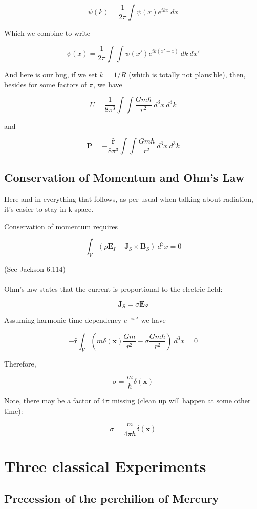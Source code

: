 \documentclass {article}
\renewcommand\vec{\mathbf}
\let\OldHat\hat
\renewcommand{\hat}[1]{\OldHat{\mathbf{#1}}}
\begin{document}
$$\psi ( k ) = \frac 1 {2 \pi} \int \psi(x) e ^{ikx} ~ dx $$

Which we combine to write

$$\psi(x) = \frac 1 {2 \pi} \int \int \psi (x') e^{ik(x' - x)} ~dk ~dx'$$


And here is our bug, if we set $k$ = $1/R$ (which is totally not plausible), then, besides for some factors of  $\pi$, we have

$$U =\frac 1 {8 \pi^3} \int \int \frac {Gm\hbar}{r^2} ~d^3x ~ d^3k$$

and 

$$\vec P = -\frac {\hat r} {8 \pi^3} \int \int \frac {Gm\hbar}{r^2} ~d^3x ~ d^3k$$
 

\newpage


\subsection {Conservation of Momentum and Ohm's Law}

Here and in everything that follows, as per usual when talking about radiation, it's easier to stay in k-space.

Conservation of momentum requires

$$\int_V \left(  \rho \vec E_I  + \vec J_S \times \vec B_S \right) ~ d^3x  = 0 $$

(See Jackson 6.114)
\\
\\

Ohm's law states that the current is proportional to the electric field:

$$\vec J_S = \sigma \vec E_S$$ 

Assuming harmonic time dependency $e^{-iwt}$ we have

$$- \hat r \int_V \left(  m \delta (\vec x) \frac {Gm}{r^2}  - \sigma \frac {Gm \hbar} {r^2} \right) ~ d^3x  = 0 $$

Therefore,

$$\sigma = \frac m \hbar \delta (\vec x) $$

Note, there may be a factor of $4 \pi $ missing (clean up will happen at some other time):

$$\sigma = \frac m {4 \pi \hbar} \delta (\vec x) $$


\newpage

\section{Three classical Experiments}
\subsection{Precession of the perehilion of Mercury}
\end{document}

